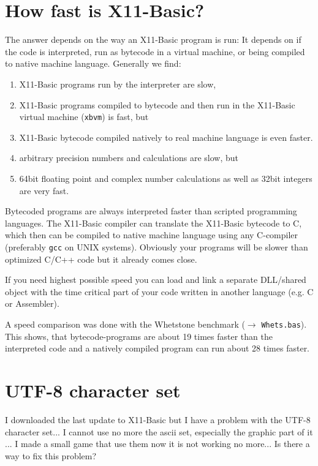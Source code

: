 \section*{How fast is X11-Basic?}

The answer depends on the way an X11-Basic program is
run: It depends on if the code is interpreted, run as bytecode in a virtual
machine, or being compiled to native machine language. Generally we find:

\begin{enumerate}
\item X11-Basic programs run by the interpreter are slow,
\item X11-Basic programs compiled to bytecode and then run in the X11-Basic 
virtual machine (\verb|xbvm|) is fast, but
\item X11-Basic bytecode compiled natively to real machine language 
is even faster.
\item arbitrary precision numbers and calculations are slow, but 
\item 64bit floating point and complex number calculations as well as 
32bit integers are very fast.
\end{enumerate}

Bytecoded programs are always interpreted faster than scripted programming 
languages. The X11-Basic compiler can translate the X11-Basic bytecode to C, 
which then can be compiled to native machine language using any C-compiler 
(preferably \verb|gcc| on UNIX systems). Obviously your programs will be slower
than optimized C/C++ code but it already comes close.

If you need highest possible speed you can load and link a separate
DLL/shared object with the time critical part of your code written in another 
language (e.g. C or Assembler). 

A speed comparison was done with the Whetstone benchmark ($\longrightarrow$
\verb|Whets.bas|). This shows, that bytecode-programs are about 19 times faster
than the interpreted code and a natively compiled program can run about 28 times
faster.



\section*{UTF-8 character set}

I downloaded the last update to X11-Basic but I have a problem 
with the UTF-8 character set... I cannot use no more the 
ascii set, especially the graphic part of it ...
I made a small game that use them now it is not working no more...
Is there a way to fix this problem?

